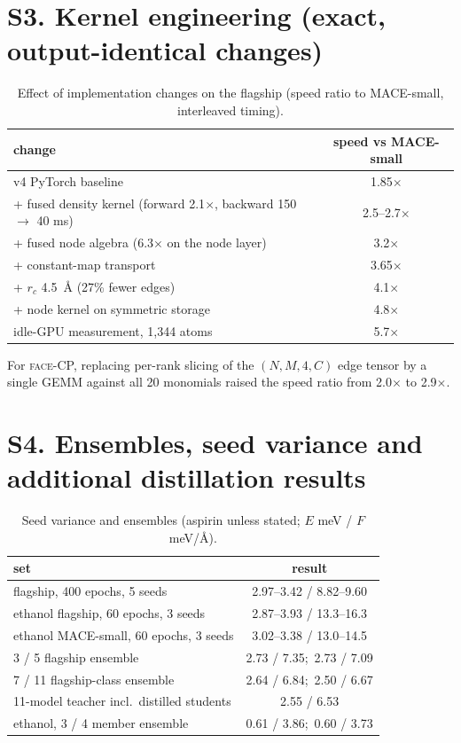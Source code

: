 \documentclass[journal=jctcce,manuscript=suppinfo,layout=traditional]{achemso}
\newcommand{\FACE}{\textsc{face}}
\begin{document}
\section*{S3. Kernel engineering (exact, output-identical changes)}
\begin{table}[h]
\caption{Effect of implementation changes on the flagship (speed ratio to MACE-small, interleaved timing).}
\label{tab:kernels}
\begin{tabular}{lc}
\toprule
change & speed vs MACE-small \\
\midrule
v4 PyTorch baseline & 1.85$\times$ \\
+ fused density kernel (forward 2.1$\times$, backward 150 $\to$ 40 ms) & 2.5--2.7$\times$ \\
+ fused node algebra (6.3$\times$ on the node layer) & 3.2$\times$ \\
+ constant-map transport & 3.65$\times$ \\
+ $r_c$ 4.5~\AA{} (27\% fewer edges) & 4.1$\times$ \\
+ node kernel on symmetric storage & 4.8$\times$ \\
idle-GPU measurement, 1,344 atoms & 5.7$\times$ \\
\bottomrule
\end{tabular}
\end{table}
For \FACE-CP, replacing per-rank slicing of the $(N,M,4,C)$ edge tensor by a single GEMM against all 20 monomials
raised the speed ratio from 2.0$\times$ to 2.9$\times$.

\section*{S4. Ensembles, seed variance and additional distillation results}
\begin{table}[h]
\caption{Seed variance and ensembles (aspirin unless stated; $E$ meV / $F$ meV/\AA).}
\label{tab:seeds}
\begin{tabular}{lc}
\toprule
set & result \\
\midrule
flagship, 400 epochs, 5 seeds & 2.97--3.42 / 8.82--9.60 \\
ethanol flagship, 60 epochs, 3 seeds & 2.87--3.93 / 13.3--16.3 \\
ethanol MACE-small, 60 epochs, 3 seeds & 3.02--3.38 / 13.0--14.5 \\
3 / 5 flagship ensemble & 2.73 / 7.35;\ 2.73 / 7.09 \\
7 / 11 flagship-class ensemble & 2.64 / 6.84;\ 2.50 / 6.67 \\
11-model teacher incl.\ distilled students & 2.55 / 6.53 \\
ethanol, 3 / 4 member ensemble & 0.61 / 3.86;\ 0.60 / 3.73 \\
\bottomrule
\end{tabular}
\end{table}
\end{document}
